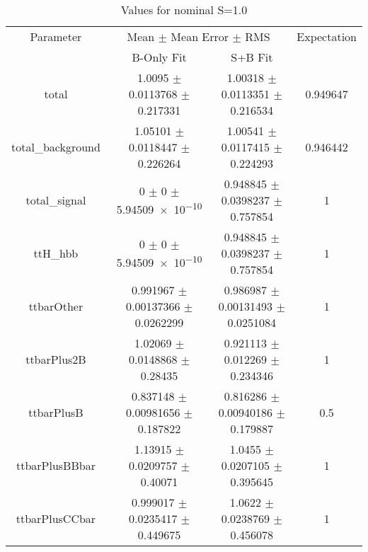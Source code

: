 \begin{table}
\centering
\caption{Values for nominal S=1.0}
\begin{tabular}{cccc}
\toprule
Parameter & \multicolumn{2}{c}{Mean $\pm$ Mean Error $\pm$ RMS} & Expectation\\
 & B-Only Fit & S+B Fit & \\
\midrule
total & \num{1.0095} $\pm$ \num{0.0113768} $\pm$ \num{0.217331} & \num{1.00318} $\pm$ \num{0.0113351} $\pm$ \num{0.216534} & \num{0.949647}\\
total\_background & \num{1.05101} $\pm$ \num{0.0118447} $\pm$ \num{0.226264} & \num{1.00541} $\pm$ \num{0.0117415} $\pm$ \num{0.224293} & \num{0.946442}\\
total\_signal & \num{0} $\pm$ \num{0} $\pm$ \num{5.94509e-10} & \num{0.948845} $\pm$ \num{0.0398237} $\pm$ \num{0.757854} & \num{1}\\
ttH\_hbb & \num{0} $\pm$ \num{0} $\pm$ \num{5.94509e-10} & \num{0.948845} $\pm$ \num{0.0398237} $\pm$ \num{0.757854} & \num{1}\\
ttbarOther & \num{0.991967} $\pm$ \num{0.00137366} $\pm$ \num{0.0262299} & \num{0.986987} $\pm$ \num{0.00131493} $\pm$ \num{0.0251084} & \num{1}\\
ttbarPlus2B & \num{1.02069} $\pm$ \num{0.0148868} $\pm$ \num{0.28435} & \num{0.921113} $\pm$ \num{0.012269} $\pm$ \num{0.234346} & \num{1}\\
ttbarPlusB & \num{0.837148} $\pm$ \num{0.00981656} $\pm$ \num{0.187822} & \num{0.816286} $\pm$ \num{0.00940186} $\pm$ \num{0.179887} & \num{0.5}\\
ttbarPlusBBbar & \num{1.13915} $\pm$ \num{0.0209757} $\pm$ \num{0.40071} & \num{1.0455} $\pm$ \num{0.0207105} $\pm$ \num{0.395645} & \num{1}\\
ttbarPlusCCbar & \num{0.999017} $\pm$ \num{0.0235417} $\pm$ \num{0.449675} & \num{1.0622} $\pm$ \num{0.0238769} $\pm$ \num{0.456078} & \num{1}\\
\bottomrule
\end{tabular}
\end{table}